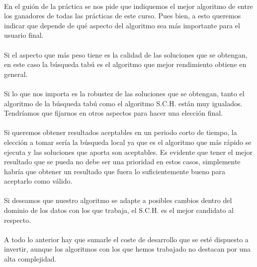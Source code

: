 	\paragraph{}En el guión de la práctica se nos pide que indiquemos el mejor algoritmo de entre los ganadores de todas las prácticas de este curso. Pues bien, a esto queremos indicar que depende de qué aspecto del algoritmo sea más importante para el usuario final.
	
	\paragraph{}Si el aspecto que más peso tiene es la calidad de las soluciones que se obtengan, en este caso la búsqueda tabú es el algoritmo que mejor rendimiento obtiene en general.
	
	\paragraph{}Si lo que nos importa es la robustez de las soluciones que se obtengan, tanto el algoritmo de la búsqueda tabú como el algoritmo S.C.H. están muy igualados. Tendríamos que fijarnos en otros aspectos para hacer una elección final.
	
	\paragraph{}Si queremos obtener resultados aceptables en un periodo corto de tiempo, la elección a tomar sería la búsqueda local ya que es el algoritmo que más rápido se ejecuta y las soluciones que aporta son aceptables. Es evidente que tener el mejor resultado que se pueda no debe ser una prioridad en estos casos, simplemente habría que obtener un resultado que fuera lo suficientemente bueno para aceptarlo como válido.
	
	\paragraph{}Si deseamos que nuestro algoritmo se adapte a posibles cambios dentro del dominio de los datos con los que trabaja, el S.C.H. es el mejor candidato al respecto.
	
	\paragraph{}A todo lo anterior hay que sumarle el coste de desarrollo que se esté dispuesto a invertir, aunque los algoritmos con los que hemos trabajado no destacan por una alta complejidad.
	

